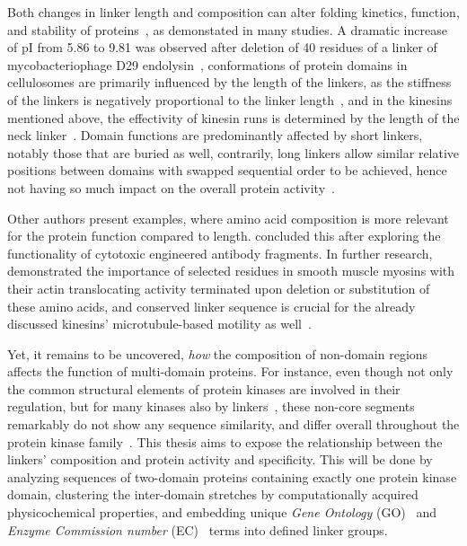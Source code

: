   Both changes in linker length and composition can alter folding kinetics, function, and
  stability of proteins~\cite{van1997linker, robinson1998optimizing}, as demonstated in
  many studies.
  A dramatic increase of pI from 5.86 to 9.81 was observed after deletion of 40
  residues of a linker of mycobacteriophage D29 endolysin~\cite{pohane2015modulation},
  conformations of protein domains in cellulosomes are primarily influenced by the length
  of the linkers, as the stiffness of the linkers is negatively proportional to the linker
  length~\cite{rozycki2017length}, and in the kinesins mentioned above, the effectivity of
  kinesin runs is determined by the length of the neck linker~\cite{shastry2010neck}.
  Domain functions are predominantly affected by short linkers, notably those that
  are buried as well, contrarily, long linkers allow similar relative positions between
  domains with swapped sequential order to be achieved, hence not having so much impact
  on the overall protein activity~\cite{bashton2002geometry}.

  Other authors present examples, where amino acid composition is more relevant for
  the protein function compared to length.
  \citet{klement2015effect} concluded this after exploring the functionality of cytotoxic
  engineered antibody fragments.
  In further research, \citet{ikebe1998hinge} demonstrated the importance of selected
  residues in smooth muscle myosins with their actin translocating activity terminated
  upon deletion or substitution of these amino acids, and conserved linker sequence is
  crucial for the already discussed kinesins' microtubule-based motility as
  well~\cite{case2000role, hariharan2009insights}.

  Yet, it remains to be uncovered, \emph{how} the composition of non-domain regions
  affects the function of multi-domain proteins.
  For instance, even though not only the common structural elements of protein kinases are
  involved in their regulation, but for many kinases also by
  linkers~\cite{gogl2019disordered}, these non-core segments remarkably do not show any
  sequence similarity, and differ overall throughout the protein kinase
  family~\cite{taylor1994three}.
  This thesis aims to expose the relationship between the linkers' composition and protein
  activity and specificity.
  This will be done by analyzing sequences of two-domain proteins containing exactly
  one protein kinase domain, clustering the inter-domain stretches by computationally
  acquired physicochemical properties, and embedding unique \emph{Gene Ontology}
  (GO)~\cite{ashburner2000gene, gene2019gene} and \emph{Enzyme Commission number}
  (EC)~\cite{webb1992enzyme, jeske2019brenda} terms into defined linker groups.

